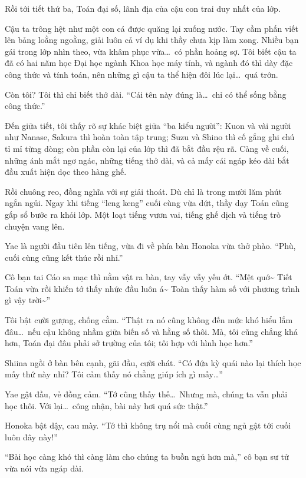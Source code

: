\documentclass[../main.tex]{subfiles}
\begin{document}
Rồi tới tiết thứ ba, Toán đại số, lãnh địa của cậu con trai duy nhất của lớp.

Cậu ta trông hệt như một con cá được quăng lại xuống nước. Tay cầm phấn viết lên bảng loằng ngoằng, giải luôn cả ví dụ khi thầy chưa kịp làm xong. Nhiều bạn gái trong lớp nhìn theo, vừa khâm phục vừa\dots\ có phần hoảng sợ. Tôi biết cậu ta đã có hai năm học Đại học ngành Khoa học máy tính, và ngành đó thì dày đặc công thức và tính toán, nên những gì cậu ta thể hiện đôi lúc lại\dots\ quá trớn.

Còn tôi? Tôi thì chỉ biết thở dài. ``Cái tên này đúng là\dots\ chỉ có thể sống bằng công thức.''

Đến giữa tiết, tôi thấy rõ sự khác biệt giữa ``ba kiểu người'': Kuon và vài người như Nanase, Sakura thì hoàn toàn tập trung; Suzu và Shino thì cố gắng ghi chú tỉ mỉ từng dòng; còn phần còn lại của lớp thì đã bắt đầu rệu rã. Càng về cuối, những ánh mắt ngơ ngác, những tiếng thở dài, và cả mấy cái ngáp kéo dài bắt đầu xuất hiện dọc theo hàng ghế.

Rồi chuông reo, đồng nghĩa với sự giải thoát. Dù chỉ là trong mười lăm phút ngắn ngủi. Ngay khi tiếng ``leng keng'' cuối cùng vừa dứt, thầy dạy Toán cũng gấp sổ bước ra khỏi lớp. Một loạt tiếng vươn vai, tiếng ghế dịch và tiếng trò chuyện vang lên.

Yae là người đầu tiên lên tiếng, vừa đi về phía bàn Honoka vừa thở phào. ``Phù, cuối cùng cũng kết thúc rồi nhỉ.''

Cô bạn tai Cáo sa mạc thì nằm vật ra bàn, tay vẫy vẫy yếu ớt. ``Mệt quớ\~{} Tiết Toán vừa rồi khiến tớ thấy nhức đầu luôn á\~{} Toàn thấy hàm số với phương trình gì vậy trời\~{}''


Tôi bật cười gượng, chống cằm. ``Thật ra nó cũng không đến mức khó hiểu lắm đâu\dots\ nếu cậu không nhầm giữa biến số và hằng số thôi. Mà, tôi cũng chẳng khá hơn, Toán đại đâu phải sở trường của tôi; tôi hợp với hình học hơn.''

Shiina ngồi ở bàn bên cạnh, gãi đầu, cười chát. ``Có đứa kỳ quái nào lại thích học mấy thứ này nhỉ? Tôi cảm thấy nó chẳng giúp ích gì mấy\dots''

Yae gật đầu, vẻ đồng cảm. ``Tớ cũng thấy thế\dots\ Nhưng mà, chúng ta vẫn phải học thôi. Với lại\dots\ công nhận, bài này hơi quá sức thật.''

Honoka bật dậy, cau mày. ``Tớ thì không trụ nổi mà cuối cùng ngủ gật tới cuối luôn đây này!''

``Bài học càng khó thì càng làm cho chúng ta buồn ngủ hơn mà,'' cô bạn sư tử vừa nói vừa ngáp dài.
\end{document}
